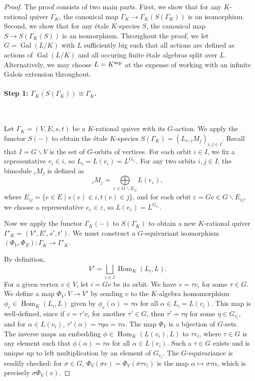 \documentclass[a4paper,12pt,reqno]{amsart}
\DeclareMathOperator{\Hom}{\mathrm{Hom}}
\DeclareMathOperator{\Gal}{\mathrm {Gal}}
\theoremstyle{plain}
\theoremstyle{remark}
\begin{document}
  \begin{proof}
    The proof consists of two main parts. First, we show that for any $K$-rational quiver $\Gamma_K$, the canonical map $\Gamma_K \to \Gamma_K(S(\Gamma_K))$ is an isomorphism. Second, we show that for any \'etale $K$-species $S$, the canonical map $S \to S(\Gamma_K(S))$ is an isomorphism. Throughout the proof, we let $G = \Gal(L/K)$ with $L$ sufficiently big such that all actions are defined as actions of $\Gal(L/K)$ and all occuring finite \'etale algebras split over $L$. Alternatively, we may choose $L=K^{\rm sep}$ at the expense of working with an infinite Galois extension throughout.

    \paragraph{Step 1: $\Gamma_K(S(\Gamma_K)) \cong \Gamma_K$.}\ 

    \smallskip
    Let $\Gamma_K = (V,E,s,t)$ be a $K$-rational quiver with its $G$-action. We apply the functor $S(-)$ to obtain the \'etale $K$-species $S(\Gamma_K) = (L_i, {}_iM_j)_{i,j \in I}$. Recall that $I=G\backslash V$ is the set of $G$-orbits of vertices. For each orbit $i\in I$, we fix a representative $v_i \in i$, so $L_i=L(v_i)=L^{G_{v_i}}$. For any two orbits $i,j \in I$, the bimodule ${}_iM_j$ is defined as
    \[
      {}_iM_j = \bigoplus\limits_{\varepsilon \in G\backslash E_{ij}} L(e_\varepsilon),
    \]
    where $E_{ij}=\{e\in E \mid s(e)\in i, t(e)\in j\}$, and for each orbit $\varepsilon=Ge \in G\backslash E_{ij}$, we choose a representative $e_\varepsilon \in \varepsilon$, so $L(e_\varepsilon) = L^{G_{e_\varepsilon}}$.

    Now we apply the functor $\Gamma_K(-)$ to $S(\Gamma_K)$ to obtain a new $K$-rational quiver $\Gamma'_K = (V',E',s',t')$. We must construct a $G$-equivariant isomorphism $(\Phi_V, \Phi_E): \Gamma_K \to \Gamma'_K$.

    \smallskip
     By definition,
    \[
    V' = \bigsqcup\limits_{i\in I} \Hom_K(L_i, L).
    \]
    For a given vertex $v \in V$, let $i=Gv$ be its orbit. We have $v=\tau v_i$ for some $\tau \in G$. We define a map $\Phi_V\colon V \to V'$ by sending $v$ to the $K$-algebra homomorphism $\phi_v \in \Hom_K(L_i,L)$ given by $\phi_v(\alpha) = \tau \alpha$ for all $\alpha\in L_i = L(v_i)$. This map is well-defined, since if $v=\tau'v_i$ for another $\tau'\in G$, then $\tau'=\tau \eta$ for some $\eta\in G_{v_i}$, and for $\alpha\in L(v_i)$, $\tau'(\alpha) = \tau \eta \alpha = \tau \alpha$. The map $\Phi_V$ is a bijection of $G$-sets. The inverse maps an embedding $\phi \in \Hom_K(L(v_i),L)$ to $\tau v_i$, where $\tau\in G$ is any element such that $\phi(\alpha)=\tau \alpha$ for all $\alpha\in L(v_i)$. Such a $\tau\in G$ exists and is unique up to left multiplication by an element of $G_{v_i}$. The $G$-equivariance is readily checked: for $\sigma\in G$, $\Phi_V(\sigma v)=\Phi_V(\sigma \tau v_i)$ is the map $\alpha \mapsto \sigma \tau \alpha$, which is precisely $\sigma \Phi_V(v)$.


\end{proof}
\end{document}
